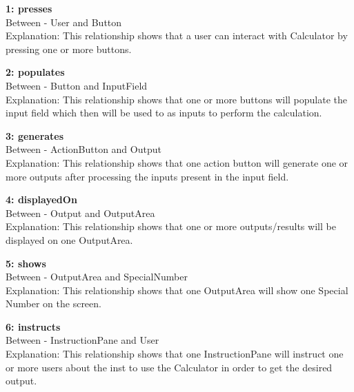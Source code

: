 \documentclass[paper=a4, fontsize=11pt]{report}
\numberwithin{equation}{section}		%
\numberwithin{figure}{section}			%
\numberwithin{table}{section}				%
\begin{document}
\begin{flushleft}
\textbf{1: presses}
\\Between - User and Button
\\Explanation: This relationship shows that a user can interact with Calculator by pressing one or more buttons.
\end{flushleft}

\begin{flushleft}
\textbf{2: populates}
\\Between - Button and InputField
\\Explanation: This relationship shows that one or more buttons will populate the input field which then will be used to as inputs to perform the calculation.
\end{flushleft}

\begin{flushleft}
\textbf{3: generates}
\\Between - ActionButton and Output
\\Explanation: This relationship shows that one action button will generate one or more outputs after processing the inputs present in the input field.
\end{flushleft}

\begin{flushleft}
\textbf{4: displayedOn}
\\Between - Output and OutputArea
\\Explanation: This relationship shows that one or more outputs/results will be displayed on one OutputArea.
\end{flushleft}

\begin{flushleft}
\textbf{5: shows}
\\Between - OutputArea and SpecialNumber
\\Explanation: This relationship shows that one OutputArea will show one Special Number on the screen.
\end{flushleft}

\begin{flushleft}
\textbf{6: instructs}
\\Between - InstructionPane and User
\\Explanation: This relationship shows that one InstructionPane will instruct one or more users about the inst to use the Calculator in order to get the desired output.
\end{flushleft}
\end{document}
